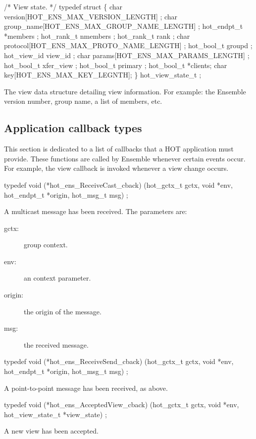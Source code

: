 \begin{codebox}
/* View state.
 */
typedef struct \{
  char version[HOT_ENS_MAX_VERSION_LENGTH] ;
  char group_name[HOT_ENS_MAX_GROUP_NAME_LENGTH] ;
  hot_endpt_t *members ;
  hot_rank_t nmembers ;
  hot_rank_t rank ;
  char protocol[HOT_ENS_MAX_PROTO_NAME_LENGTH] ;
  hot_bool_t groupd ;
  hot_view_id view_id ;
  char params[HOT_ENS_MAX_PARAMS_LENGTH] ;
  hot_bool_t xfer_view ;
  hot_bool_t primary ;
  hot_bool_t *clients;
  char key[HOT_ENS_MAX_KEY_LEGNTH];
\} hot_view_state_t ;
\end{codebox}
The view data structure detailing view information. For example: the
Ensemble version number, group name, a list of members, etc. 


\subsection{Application callback types}

This section is dedicated to a list of callbacks that a HOT
application must provide. These functions are called by Ensemble
whenever certain events occur. For example, the view callback is
invoked whenever a view change occurs.

\begin{codebox}
typedef void (*hot_ens_ReceiveCast_cback)
    (hot_gctx_t gctx, void *env, hot_endpt_t *origin, hot_msg_t msg) ;
\end{codebox}
A multicast message has been received. The parameters are: 
\begin{description}
\item[gctx:] group context.
\item[env:] an context parameter.
\item[origin:] the origin of the message.
\item[msg:] the received message.
\end{description}

\begin{codebox}
typedef void (*hot_ens_ReceiveSend_cback)
    (hot_gctx_t gctx, void *env, hot_endpt_t *origin, hot_msg_t msg) ;
\end{codebox}
A point-to-point message has been received, as above. 

\begin{codebox}
typedef void (*hot_ens_AcceptedView_cback)
    (hot_gctx_t gctx, void *env, hot_view_state_t *view_state) ;
\end{codebox}
A new view has been accepted. 

